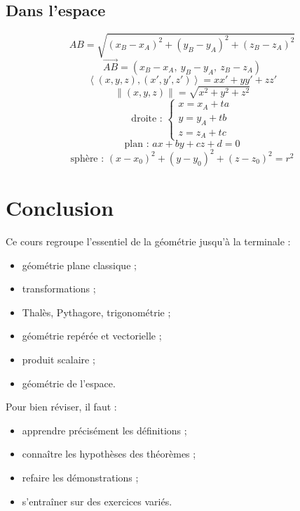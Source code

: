 \documentclass[11pt,a4paper]{article}
\newcommand{\norme}[1]{\left\|#1\right\|}
\newcommand{\ps}[2]{\left\langle #1,#2\right\rangle}
\theoremstyle{definition}
\theoremstyle{plain}
\begin{document}
\subsection*{Dans l'espace}
\[
AB=\sqrt{(x_B-x_A)^2+(y_B-y_A)^2+(z_B-z_A)^2}
\]
\[
\overrightarrow{AB}=(x_B-x_A,\ y_B-y_A,\ z_B-z_A)
\]
\[
\ps{(x,y,z)}{(x',y',z')}=xx'+yy'+zz'
\]
\[
\norme{(x,y,z)}=\sqrt{x^2+y^2+z^2}
\]
\[
\text{droite : }
\left\{
\begin{array}{l}
x=x_A+ta\\
y=y_A+tb\\
z=z_A+tc
\end{array}
\right.
\]
\[
\text{plan : } ax+by+cz+d=0
\]
\[
\text{sphère : } (x-x_0)^2+(y-y_0)^2+(z-z_0)^2=r^2
\]

\section*{Conclusion}

Ce cours regroupe l'essentiel de la géométrie jusqu'à la terminale :
\begin{itemize}
    \item géométrie plane classique ;
    \item transformations ;
    \item Thalès, Pythagore, trigonométrie ;
    \item géométrie repérée et vectorielle ;
    \item produit scalaire ;
    \item géométrie de l'espace.
\end{itemize}

Pour bien réviser, il faut :
\begin{itemize}
    \item apprendre précisément les définitions ;
    \item connaître les hypothèses des théorèmes ;
    \item refaire les démonstrations ;
    \item s'entraîner sur des exercices variés.
\end{itemize}
\end{document}

